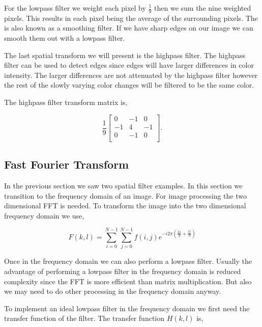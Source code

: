 For the lowpass filter we weight each pixel by $\frac{1}{9}$ then we sum the nine weighted pixels. This results in each pixel being the average of the surrounding pixels. The  is also known as a smoothing filter. If we have sharp edges on our image we can smooth them out with a lowpass filter. 

The last spatial transform we will present is the highpass filter. The highpass filter can be used to detect edges since edges will have larger differences in color intensity. The larger differences are not attenuated by the highpass filter however the rest of the slowly varying color changes will be filtered to be the same color.

The highpass filter transform matrix is,

\begin{equation}
\frac{1}{9}\begin{bmatrix}
0 & -1 & 0\\
-1 & 4 & -1\\
0 & -1 & 0\\
\end{bmatrix}.
\end{equation}

\cite{gonzalez2002digital}	
	
\subsection{Fast Fourier Transform}
	
In the previous section we saw two spatial filter examples. In this section we transition to the frequency domain of an image. For image processing the two dimensional \ac{FFT} is needed. To transform the image into the two dimensional frequency domain we use,

\begin{equation}
F\left(k,l\right)=\sum_{i=0}^{N-1}\sum_{j=0}^{N-1}f\left(i,j\right)e^{-i2\pi\left(\frac{ki}{N}+\frac{lj}{N}\right)}
\end{equation}

Once in the frequency domain we can also perform a lowpass filter. Usually the advantage of performing a lowpass filter in the frequency domain is reduced complexity since the \ac{FFT} is more efficient than matrix multiplication. But also we may need to do other processing in the frequency domain anyway. 

To implement an ideal lowpass filter in the frequency domain we first need the transfer function of the filter. The transfer function $H(k,l)$ is,

